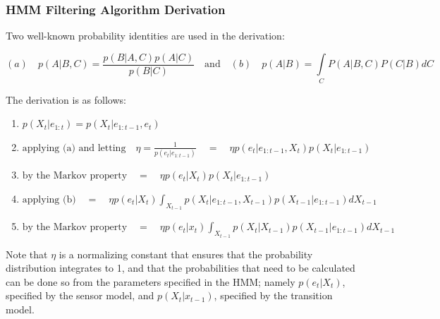 \subsubsection{HMM Filtering Algorithm Derivation} 
\label{section:HMMFiltering}
Two well-known probability identities are used in the derivation: 
\begin{center}
\end{center}
\[(a) \quad p(A | B, C) = \frac{p(B | A, C) p(A | C)}{p(B | C)} \quad \text{and} \quad (b) \quad p(A | B) = \int\limits_{C}P(A | B, C) P(C | B)dC\]

\begin{center}
\end{center}
The derivation is as follows:
\begin{enumerate}
\item {$ p(X_t | e_{1:t}) = p(X_t | e_{1:t-1}, e_t) $ }

\item{$ \text{applying (a) and letting} \quad \eta = \frac{1}{p(e_t | e_{1:t-1})} \quad = \quad \eta p(e_t | e_{1:t-1}, X_t)p(X_t|e_{1:t-1}) $ }

\item{$ \text{by the Markov property} \quad = \quad \eta p(e_t | X_t)p(X_t|e_{1:t-1})$}

\item{$\text{applying (b)} \quad =  \quad \eta p(e_t | X_t)\int_{X_{t-1}}p(X_t|e_{1:t-1}, X_{t-1}) p(X_{t-1}|e_{1:t-1})dX_{t-1}$}

\item{$ \text{by the Markov property} \quad = \quad \eta p(e_t | x_t)\int_{X_{t-1}}p(X_t|X_{t-1}) p(X_{t-1}|e_{1:t-1})dX_{t-1} $}

\end{enumerate}
Note that $\eta$ is a normalizing constant that ensures that the probability distribution integrates to 1, and that the probabilities that need to be calculated can be done so from the parameters specified in the HMM; namely $p(e_t | X_t)$, specified by the sensor model, and $p(X_t | x_{t-1})$, specified by the transition model.

